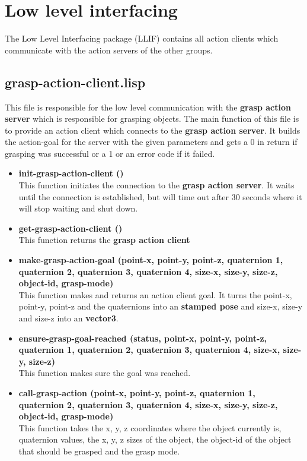 \documentclass[main.tex]{subfiles}
\begin{document}
          \section{Low level interfacing}
          \label{llif}
        The Low Level Interfacing package (LLIF) contains all action clients which communicate with the action servers of the other groups.
        \subsection{grasp-action-client.lisp}
        This file is responsible for the low level communication with the \textbf{grasp action server} which is responsible for grasping objects. The main function of this file is to provide an action client which connects to the \textbf{grasp action server}. It builds the action-goal for the server with the given parameters and gets a 0 in return if grasping was successful or a 1  or an error code if it failed.
        \begin{itemize}
            \item \textbf{init-grasp-action-client ()} \\
            This function initiates the connection to the \textbf{grasp action server}. It waits until the connection is established, but will time out after 30 seconds where it will stop waiting and shut down. 
            \item \textbf{get-grasp-action-client ()} \\
            This function returns the \textbf{grasp action client}
            \item \textbf{make-grasp-action-goal (point-x, point-y, point-z, quaternion 1, quaternion 2, quaternion 3, quaternion 4, size-x, size-y, size-z, object-id, grasp-mode)} \\
            This function makes and returns an action client goal. It turns the point-x, point-y, point-z and the quaternions into an \textbf{stamped pose} and size-x, size-y and size-z into an \textbf{vector3}.
            \item \textbf{ensure-grasp-goal-reached (status, point-x, point-y, point-z, quaternion 1, quaternion 2, quaternion 3, quaternion 4, size-x, size-y, size-z)} \\
            This function makes sure the goal was reached.
            \item \textbf{call-grasp-action (point-x, point-y, point-z, quaternion 1, quaternion 2, quaternion 3, quaternion 4, size-x, size-y, size-z, object-id, grasp-mode)} \\
            This function takes the x, y, z coordinates where the object currently is, quaternion values, the x, y, z sizes of the object, the object-id of the object that should be grasped and the grasp mode.
        \end{itemize}
\end{document}
